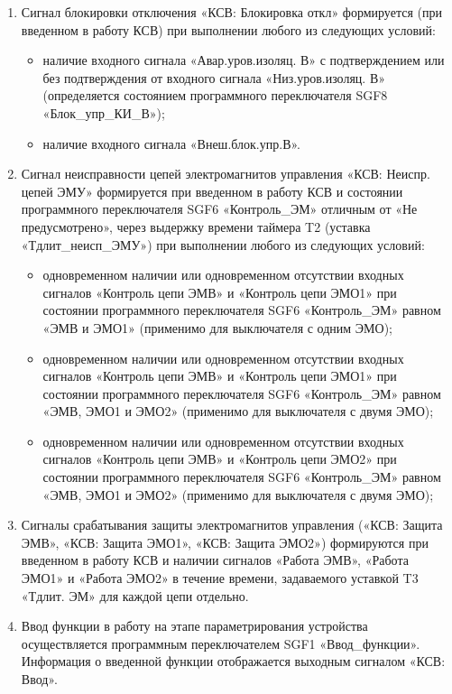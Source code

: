 \begin{enumerate}
\item
Сигнал блокировки отключения «КСВ: Блокировка откл» формируется (при введенном в работу КСВ) при выполнении любого из следующих условий:
\begin{itemize}
\sloppy
\item наличие входного сигнала «Авар.уров.изоляц. В» с подтверждением или без подтверждения от входного сигнала «Низ.уров.изоляц. В» (определяется состоянием программного переключателя SGF8 «Блок\_упр\_КИ\_В»);
\item наличие входного сигнала «Внеш.блок.упр.В».
\end{itemize}

\item
Сигнал неисправности цепей электромагнитов управления «КСВ: Неиспр. цепей ЭМУ» формируется при введенном в работу КСВ и состоянии программного переключателя SGF6 «Контроль\_ЭМ» отличным от «Не предусмотрено», через выдержку времени таймера T2 (уставка «Тдлит\_неисп\_ЭМУ») при выполнении любого из следующих условий:
\begin{itemize}
\item одновременном наличии или одновременном отсутствии входных сигналов «Контроль цепи ЭМВ» и «Контроль цепи ЭМО1» при состоянии программного переключателя SGF6 «Контроль\_ЭМ» равном «ЭМВ и ЭМО1» (применимо для выключателя с одним ЭМО);
\item одновременном наличии или одновременном отсутствии входных сигналов «Контроль цепи ЭМВ» и «Контроль цепи ЭМО1» при состоянии программного переключателя SGF6 «Контроль\_ЭМ» равном «ЭМВ, ЭМО1 и ЭМО2» (применимо для выключателя с двумя ЭМО);
\item одновременном наличии или одновременном отсутствии входных сигналов «Контроль цепи ЭМВ» и «Контроль цепи ЭМО2» при состоянии программного переключателя SGF6 «Контроль\_ЭМ» равном «ЭМВ, ЭМО1 и ЭМО2» (применимо для выключателя с двумя ЭМО);
\end{itemize}

\item
Сигналы срабатывания защиты электромагнитов управления («КСВ: Защита ЭМВ», «КСВ: Защита ЭМО1», «КСВ: Защита ЭМО2») формируются при введенном в работу КСВ и наличии сигналов «Работа ЭМВ», «Работа ЭМО1» и «Работа ЭМО2» в течение времени, задаваемого уставкой T3 «Тдлит. ЭМ» для каждой цепи отдельно.

\item
Ввод функции в работу на этапе параметрирования устройства осуществляется программным переключателем SGF1 «Ввод\_функции». Информация о введенной функции отображается выходным сигналом «КСВ: Ввод».


\end{enumerate}
